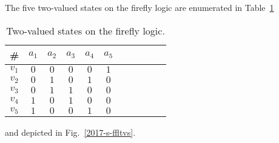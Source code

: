 The five two-valued states on the firefly logic are enumerated in Table~\ref{2017-b-t-fireflytvs}
 \begin{table}%
 \begin{center}
 \caption{\label{2017-b-t-fireflytvs}  Two-valued states on the firefly logic.}
 \begin{tabular}{ccccccccccc}
 \hline\hline %
 \#     &$a_1$&$a_2$&$a_3$&$a_4$&$a_5$\\
\hline
$v_1$&$0$&$0$&$0$&$0$&$1$  \\
$v_2$&$0$&$1$&$0$&$1$&$0$  \\
$v_3$&$0$&$1$&$1$&$0$&$0$  \\
$v_4$&$1$&$0$&$1$&$0$&$0$  \\
$v_5$&$1$&$0$&$0$&$1$&$0$ \\
 \hline\hline %
 \end{tabular}
 \end{center}
 \end{table}
and depicted in Fig.~\ref{2017-s-ffltvs}.



